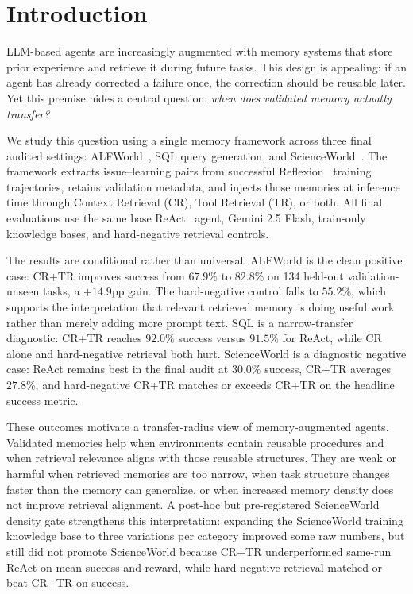\section{Introduction}

LLM-based agents are increasingly augmented with memory systems that store prior experience and retrieve it during future tasks.
This design is appealing: if an agent has already corrected a failure once, the correction should be reusable later.
Yet this premise hides a central question: \emph{when does validated memory actually transfer?}

We study this question using a single memory framework across three final audited settings: ALFWorld~\citep{shridhar2021alfworld}, SQL query generation, and ScienceWorld~\citep{wang2022scienceworld}.
The framework extracts issue--learning pairs from successful Reflexion~\citep{shinn2023reflexion} training trajectories, retains validation metadata, and injects those memories at inference time through Context Retrieval (CR), Tool Retrieval (TR), or both.
All final evaluations use the same base ReAct~\citep{yao2023react} agent, Gemini 2.5 Flash, train-only knowledge bases, and hard-negative retrieval controls.

The results are conditional rather than universal.
ALFWorld is the clean positive case: CR+TR improves success from $67.9\%$ to $82.8\%$ on 134 held-out validation-unseen tasks, a $+14.9$pp gain.
The hard-negative control falls to $55.2\%$, which supports the interpretation that relevant retrieved memory is doing useful work rather than merely adding more prompt text.
SQL is a narrow-transfer diagnostic: CR+TR reaches $92.0\%$ success versus $91.5\%$ for ReAct, while CR alone and hard-negative retrieval both hurt.
ScienceWorld is a diagnostic negative case: ReAct remains best in the final audit at $30.0\%$ success, CR+TR averages $27.8\%$, and hard-negative CR+TR matches or exceeds CR+TR on the headline success metric.

These outcomes motivate a transfer-radius view of memory-augmented agents.
Validated memories help when environments contain reusable procedures and when retrieval relevance aligns with those reusable structures.
They are weak or harmful when retrieved memories are too narrow, when task structure changes faster than the memory can generalize, or when increased memory density does not improve retrieval alignment.
A post-hoc but pre-registered ScienceWorld density gate strengthens this interpretation: expanding the ScienceWorld training knowledge base to three variations per category improved some raw numbers, but still did not promote ScienceWorld because CR+TR underperformed same-run ReAct on mean success and reward, while hard-negative retrieval matched or beat CR+TR on success.

